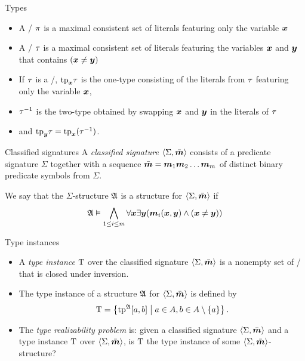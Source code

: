 \documentclass{beamer}
\begin{document}
\begin{frame}{Types}
\begin{itemize}
  \item A \onetype/ $\pi$ is a maximal consistent set of literals featuring
  only the variable $\bm{x}$
  \item A \twotype/ $\tau$ is a maximal consistent set of literals featuring the
  variables $\bm{x}$ and $\bm{y}$ that contains $(\bm{x}\neq\bm{y})$
\begin{center}
\end{center}
  \item If $\tau$ is a \twotype/, $\mathrm{tp}_{\bm{x}}\tau$ is the one-type consisting of the
  literals from $\tau$ featuring only the variable $\bm{x}$,
  \item $\tau^{-1}$ is the two-type obtained by swapping $\bm{x}$ and $\bm{y}$ in the
  literals of $\tau$
  \item and $\mathrm{tp}_{\bm{y}}\tau=\mathrm{tp}_{\bm{x}}(\tau^{-1})$.
\end{itemize}
\end{frame}

\begin{frame}{Classified signatures}
A \emph{classified signature} $\left\langle \Sigma,\bar{\bm{m}} \right\rangle$ consists of a predicate
signature $\Sigma$ together with a sequence $\sms=\smm1\smm2\dots\smm\nm$ of
distinct binary predicate symbols from $\Sigma$.

We say that the $\Sigma$-structure $\mathfrak{A}$ is a structure for $\left\langle \Sigma,\bar{\bm{m}} \right\rangle$
if
\[
\mathfrak{A}\vDash\bigwedge_{1\leq i\leq m}\forall\bm{x}\exists\bm{y}
(\bm{m}_{i}(\bm{x},\bm{y})\land(\bm{x}\neq\bm{y}))
\]
\end{frame}

\begin{frame}{Type instances}
\begin{itemize}
  \item 
  A \emph{type instance} $\mathrm{T}$ over the classified signature $\left\langle \Sigma,\bar{\bm{m}} \right\rangle$
  is a nonempty set of \twotypes/ that is closed under inversion.

  \item 
  The type instance of a structure $\mathfrak{A}$ for $\left\langle \Sigma,\bar{\bm{m}} \right\rangle$ is defined by
  \[
  \mathrm{T} = \left\{\operatorname{tp}^{\mathfrak{A}}[a,b]\mathrel{}\middle|\mathrel{}a\in A,b\in A\setminus\left\{a\right\}\right\}.
  \]

  \item The \emph{type realizability problem} is: given a classified signature
  $\left\langle \Sigma,\bar{\bm{m}} \right\rangle$ and a type instance $\mathrm{T}$ over $\left\langle \Sigma,\bar{\bm{m}} \right\rangle$,
  is $\mathrm{T}$ the type instance of some $\left\langle \Sigma,\bar{\bm{m}} \right\rangle$-structure?
\end{itemize}
\end{frame}
\end{document}
